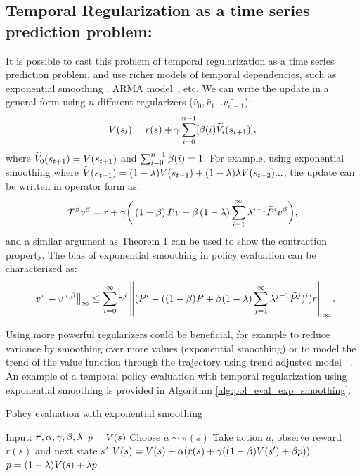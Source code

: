 \subsection{Temporal Regularization as a time series prediction problem:}
It is possible to cast this problem of temporal regularization as a time series prediction problem, and use richer models of temporal dependencies, such as exponential smoothing \citep{gardner2006exponential}, ARMA model~\citep{box94}, etc. We can write the update in a general form using $n$ different regularizers ($\widetilde{v_0},\widetilde{v_1}...\widetilde{v_{n-1}}$):
\begin{equation}
    V(s_t) = r(s) + \gamma \sum_{i=0}^{n-1} [\beta(i) \widetilde{V}_i(s_{t+1})],
\end{equation}
where $\widetilde{V}_0(s_{t+1}) = V(s_{t+1})$ and $\sum_{i=0}^{n-1} \beta(i) = 1$. For example, using exponential smoothing where $\widetilde{V}(s_{t+1}) = (1-\lambda) V(s_{t-1}) + (1-\lambda)\lambda V(s_{t-2})...$, the update can be written in operator form as:
\begin{equation}
    \label{eq:exp_smooth}
    \mathcal{T}^{\beta} v^{\beta} = r + \gamma \bigg(\left(1-\beta\right) Pv + \beta \left(1-\lambda\right) \sum_{i=1}^{\infty} \lambda^{i-1} \widetilde{P}^i v^{\beta} \bigg),
\end{equation}
and a similar argument as Theorem 1 can be used to show the contraction property. The bias of exponential smoothing in policy evaluation can be characterized as:
\begin{equation}
        \left\lVert v^{\pi} - v^{\pi,\beta}\right\rVert_{\infty} \leq  \sum_{i=0}^{\infty} \gamma^i \left\lVert (P^i-((1-\beta) P + \beta (1-\lambda) \sum_{j=1}^{\infty} \lambda^{j-1} \widetilde{P}^j)^i) r\right\rVert_{\infty}.
\end{equation}

Using more powerful regularizers could be beneficial, for example to reduce variance by smoothing over more values (exponential smoothing) or to model the trend of the value function through the trajectory using trend adjusted model ~\citep{gardner1985exponential}. An example of a temporal policy evaluation with temporal regularization using exponential smoothing is provided in Algorithm \ref{alg:pol_eval_exp_smoothing}.
\begin{algorithm}[H]
\caption[Policy evaluation with Temporal Regularization]{Policy evaluation with exponential smoothing}
\begin{algorithmic}[1]
    \STATE Input: $\pi,\alpha,\gamma,\beta,\lambda$
    \STATE $p = V(s)$
        \STATE Choose $a \sim \pi(s)$
        \STATE Take action $a$, observe reward $r(s)$ and next state $s'$
        \STATE $V(s) = V(s) +  \alpha (r(s) + \gamma ( (1-\beta) V(s') + \beta p)) $
        \STATE $p = (1-\lambda)V(s) + \lambda p$
    \ENDFOR
\end{algorithmic}
\label{alg:pol_eval_exp_smoothing}
\end{algorithm}



